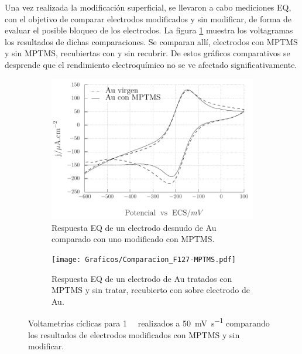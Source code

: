 			Una vez realizada la modificación superficial, se llevaron a cabo mediciones EQ, con el objetivo de comparar electrodos modificados y sin modificar, de forma de evaluar el posible bloqueo de los electrodos. La figura \ref{fig:comparaciones_MPTMS} muestra los voltagramas los resultados de dichas comparaciones. Se comparan allí, electrodos con MPTMS y sin MPTMS, recubiertas con \pdm\space y sin recubrir. De estos gráficos comparativos se desprende que el rendimiento electroquímico no se ve afectado significativamente.
	 		
		 			\begin{figure}[th]
			 	   	    \begin{subfigure}[t]{0.49\textwidth}
				        	\includegraphics[width=\textwidth]{Graficos/Comparacion_Au-MPTMS.pdf}
				       		\caption{Respuesta EQ de un electrodo desnudo de Au comparado con uno modificado con MPTMS.}	
				       		\end{subfigure}
						\begin{subfigure}[t]{0.49\textwidth}
				 	   	    \texttt{[image: Graficos/Comparacion\_F127-MPTMS.pdf]}
				       		\caption{Respuesta EQ de un electrodo de Au tratados con MPTMS y sin tratar, recubierto con \pdmF\space sobre electrodo de Au.}
				       		\end{subfigure}
						 	\caption[Comparación de superficies con y sin MPTMS.]{Voltametrías cíclicas para \aminorutenio\space \SI{1}{\milli\Molar} realizados a \SI{50}{\milli\volt.\second^{-1}} comparando los resultados de electrodos modificados con MPTMS y sin modificar.}
						 \label{fig:comparaciones_MPTMS}	
					     \end{figure}
			
